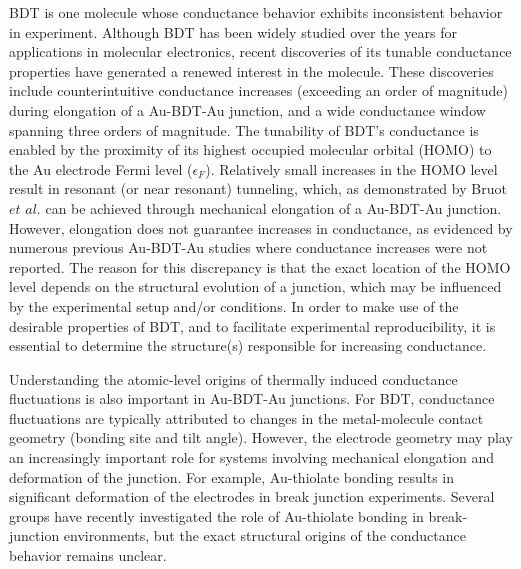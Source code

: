 \documentclass[10pt]{report}  %
\begin{document}
BDT is one molecule whose conductance behavior exhibits inconsistent behavior in experiment. Although BDT has been widely studied over the years for applications in molecular electronics, \cite{Reed:1997,Xiao:2004,Tsutsui:2009-nanoscale,Song:2009,Bruot:2012,Kim:2011,Sergueev:2010,Pontes:2011,Strange:2010,Romaner:2006,French:2012,Pu:2010} recent discoveries \cite{Song:2009,Bruot:2012,Kim:2011} of its tunable conductance properties have generated a renewed interest in the molecule. These discoveries include counterintuitive conductance increases (exceeding an order of magnitude) during elongation of a Au-BDT-Au junction,\cite{Bruot:2012} and a wide conductance window spanning three orders of magnitude.\cite{Kim:2011} The tunability of BDT's conductance is enabled by the proximity of its highest occupied molecular orbital (HOMO) to the Au electrode Fermi level ($\epsilon_{F}$). Relatively small increases in the HOMO level result in resonant (or near resonant) tunneling, which, as demonstrated by Bruot $et$ $al.$ \cite{Bruot:2012} can be achieved through mechanical elongation of a Au-BDT-Au junction. However, elongation does not guarantee increases in conductance, as evidenced by numerous previous Au-BDT-Au studies \cite{Reed:1997,Xiao:2004,Kim:2011} where conductance increases were not reported. The reason for this discrepancy is that the exact location of the HOMO level depends on the structural evolution of a junction, which may be influenced by the experimental setup and/or conditions. In order to make use of the desirable properties of BDT, and to facilitate experimental reproducibility, it is essential to determine the structure(s) responsible for increasing conductance. 

Understanding the atomic-level origins of thermally induced conductance fluctuations is also important in Au-BDT-Au junctions. For BDT, conductance fluctuations are typically attributed to changes in the metal-molecule contact geometry (bonding site and tilt angle). \cite{Kim:2011,Haiss:2008,Tsutsui:2006} However, the electrode geometry may play an increasingly important role for systems involving mechanical elongation and deformation of the junction. \cite{Ulrich:2006,Malen:2009,Venkataraman-nature:2006,Kiguchi:2012,Kim:2011,Tsutsui:2006,Tsutsui:2009,Frei:2012,Arroyo:2011,Yokota:2010,Huang:2007,Bruot:2012,Xiao:2004} For example, Au-thiolate bonding results in significant deformation of the electrodes in break junction experiments. Several groups \cite{Frei:2012,Arroyo:2011,Yokota:2010} have recently investigated the role of Au-thiolate bonding in break-junction environments, but the exact structural origins of the conductance behavior remains unclear. 
\end{document}
